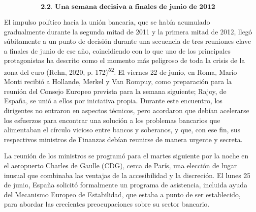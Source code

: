 \documentclass[10pt,a4paper]{article}
\begin{document}
{$$\textbf{2.2. Una semana decisiva a finales de junio de 2012}$$

El impulso político hacia la unión bancaria, que se había acumulado gradualmente durante la segunda mitad de 2011 y la primera mitad de 2012, llegó súbitamente a un punto de decisión durante una secuencia de tres reuniones clave a finales de junio de ese año, coincidiendo con lo que uno de los principales protagonistas ha descrito como el momento más peligroso de toda la crisis de la zona del euro (Rehn, 2020, p. 172)\textsuperscript{52}. El viernes 22 de junio, en Roma, Mario Monti recibió a Hollande, Merkel y Van Rompuy, como preparación para la reunión del Consejo Europeo prevista para la semana siguiente; Rajoy, de España, se unió a ellos por iniciativa propia. Durante este encuentro, los dirigentes no entraron en aspectos técnicos, pero acordaron que debían acelerarse los esfuerzos para encontrar una solución a los problemas bancarios que alimentaban el círculo vicioso entre bancos y soberanos, y que, con ese fin, sus respectivos ministros de Finanzas debían reunirse de manera urgente y secreta.

La reunión de los ministros se programó para el martes siguiente por la noche en el aeropuerto Charles de Gaulle (CDG), cerca de París, una elección de lugar inusual que combinaba las ventajas de la accesibilidad y la discreción. El lunes 25 de junio, España solicitó formalmente un programa de asistencia, incluida ayuda del Mecanismo Europeo de Estabilidad, que estaba a punto de ser establecido, para abordar las crecientes preocupaciones sobre su sector bancario.

}
\end{document}
